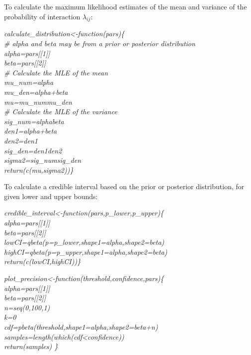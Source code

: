 \documentclass[12pt]{article}
\begin{document}
    To calculate the maximum likelihood estimates of the mean and 
    variance of the probability of interaction $\lambda_{ij}$:

    \vspace{12pt}
    \emph{
    calculate\_distribution\textless-function(pars)\{\\
      \# alpha and beta may be from a prior or posterior distribution\\
      alpha=pars[[1]]\\
      beta=pars[[2]]\\


      \# Calculate the MLE of the mean\\
      mu\_num=alpha\\
      mu\_den=alpha+beta\\
      mu=mu\_num\/mu\_den\\


      \# Calculate the MLE of the variance\\
      sig\_num=alpha\*beta\\
      den1=alpha+beta\\
      den2=den1\*\\
      sig\_den=den1\*den2\\
      sigma2=sig\_num\/sig\_den\\


      return(c(mu,sigma2))\}
    }
  \vspace{12pt}
      

  To calculate a credible interval based on the prior or posterior distribution, for given lower and upper bounds:


  \vspace{12pt}
  \emph{
  credible\_interval\textless-function(pars,p\_lower,p\_upper)\{\\
    alpha=pars[[1]]\\
    beta=pars[[2]]\\
    lowCI=qbeta(p=p\_lower,shape1=alpha,shape2=beta)\\
    highCI=qbeta(p=p\_upper,shape1=alpha,shape2=beta)\\
    return(c(lowCI,highCI))\}
  }


  \vspace{12pt}
  \emph{
  plot\_precision\textless-function(threshold,confidence,pars)\{\\
    alpha=pars[[1]]\\
    beta=pars[[2]]\\
    n=seq(0,100,1)\\
    k=0\\
    cdf=pbeta(threshold,shape1=alpha,shape2=beta+n)\\
    samples=length(which(cdf<confidence))\\
    return(samples) \}
  }


\clearpage

     
\end{document}
